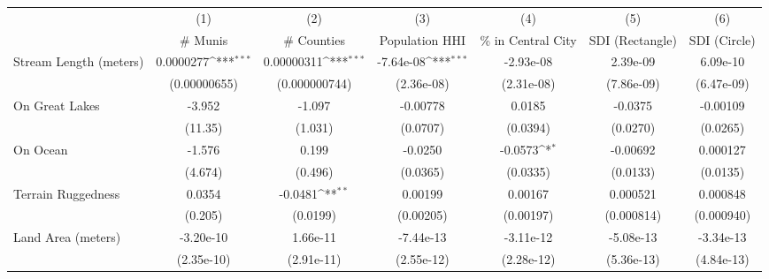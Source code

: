 {
\def\sym#1{\ifmmode^{#1}\else\(^{#1}\)\fi}
\begin{tabular}{l*{6}{c}}
\toprule
                    &\multicolumn{1}{c}{(1)}&\multicolumn{1}{c}{(2)}&\multicolumn{1}{c}{(3)}&\multicolumn{1}{c}{(4)}&\multicolumn{1}{c}{(5)}&\multicolumn{1}{c}{(6)}\\
                    &\multicolumn{1}{c}{\# Munis}&\multicolumn{1}{c}{\# Counties}&\multicolumn{1}{c}{Population HHI}&\multicolumn{1}{c}{\% in Central City}&\multicolumn{1}{c}{SDI (Rectangle)}&\multicolumn{1}{c}{SDI (Circle)}\\
\midrule
Stream Length (meters)&   0.0000277\sym{***}&  0.00000311\sym{***}&   -7.64e-08\sym{***}&   -2.93e-08         &    2.39e-09         &    6.09e-10         \\
                    &(0.00000655)         &(0.000000744)         &  (2.36e-08)         &  (2.31e-08)         &  (7.86e-09)         &  (6.47e-09)         \\
\addlinespace
On Great Lakes      &      -3.952         &      -1.097         &    -0.00778         &      0.0185         &     -0.0375         &    -0.00109         \\
                    &     (11.35)         &     (1.031)         &    (0.0707)         &    (0.0394)         &    (0.0270)         &    (0.0265)         \\
\addlinespace
On Ocean            &      -1.576         &       0.199         &     -0.0250         &     -0.0573\sym{*}  &    -0.00692         &    0.000127         \\
                    &     (4.674)         &     (0.496)         &    (0.0365)         &    (0.0335)         &    (0.0133)         &    (0.0135)         \\
\addlinespace
Terrain Ruggedness  &      0.0354         &     -0.0481\sym{**} &     0.00199         &     0.00167         &    0.000521         &    0.000848         \\
                    &     (0.205)         &    (0.0199)         &   (0.00205)         &   (0.00197)         &  (0.000814)         &  (0.000940)         \\
\addlinespace
Land Area (meters)  &   -3.20e-10         &    1.66e-11         &   -7.44e-13         &   -3.11e-12         &   -5.08e-13         &   -3.34e-13         \\
                    &  (2.35e-10)         &  (2.91e-11)         &  (2.55e-12)         &  (2.28e-12)         &  (5.36e-13)         &  (4.84e-13)         \\

\end{tabular}}

